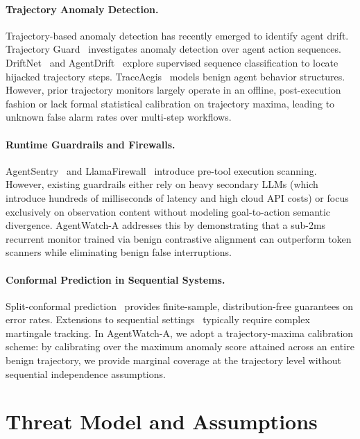 \documentclass[11pt,a4paper]{article}
\begin{document}
\paragraph{Trajectory Anomaly Detection.}
Trajectory-based anomaly detection has recently emerged to identify agent drift. Trajectory Guard~\cite{gao2026trajectory} investigates anomaly detection over agent action sequences. DriftNet~\cite{shi2026driftnet} and AgentDrift~\cite{zhou2026agentdrift} explore supervised sequence classification to locate hijacked trajectory steps. TraceAegis~\cite{zhang2025traceaegis} models benign agent behavior structures. However, prior trajectory monitors largely operate in an offline, post-execution fashion or lack formal statistical calibration on trajectory maxima, leading to unknown false alarm rates over multi-step workflows.

\paragraph{Runtime Guardrails and Firewalls.}
AgentSentry~\cite{chen2026agentsentry} and LlamaFirewall~\cite{bhatt2025llamafirewall} introduce pre-tool execution scanning. However, existing guardrails either rely on heavy secondary LLMs (which introduce hundreds of milliseconds of latency and high cloud API costs) or focus exclusively on observation content without modeling goal-to-action semantic divergence. AgentWatch-A addresses this by demonstrating that a sub-2ms recurrent monitor trained via benign contrastive alignment can outperform token scanners while eliminating benign false interruptions.

\paragraph{Conformal Prediction in Sequential Systems.}
Split-conformal prediction~\cite{vovk2005algorithmic,angelopoulos2021gentle} provides finite-sample, distribution-free guarantees on error rates. Extensions to sequential settings~\cite{tibshirani2019conformal,barber2021predictive} typically require complex martingale tracking. In AgentWatch-A, we adopt a trajectory-maxima calibration scheme: by calibrating over the maximum anomaly score attained across an entire benign trajectory, we provide marginal coverage at the trajectory level without sequential independence assumptions.

\section{Threat Model and Assumptions}
\label{sec:threat_model}
\end{document}
